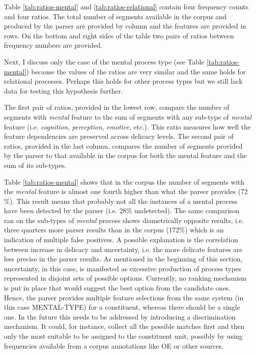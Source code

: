     Table \ref{tab:ratios-mental} and \ref{tab:ratios-relational} contain four frequency counts and four ratios. The total number of segments available in the corpus and produced by the parser are provided by column and the features are provided in rows. On the bottom and right sides of the table two pairs of ratios between frequency numbers are provided. 
    
    Next, I discuss only the case of the mental process type (see Table \ref{tab:ratios-mental}) because the values of the ratios are very similar and the same holds for relational processes. Perhaps this holds for other process types but we still lack data for testing this hypothesis further. 
    
    The first pair of ratios, provided in the lowest row, compare the number of segments with \textit{mental} feature to the sum of segments with any sub-type of \textit{mental} feature (i.e.  \textit{cognition}, \textit{perception}, \textit{emotive}, etc.). This ratio measures how well the feature dependencies are preserved across delicacy levels. The second pair of ratios, provided in the last column, compares the number of segments provided by the parser to that available in the corpus for both the mental feature and the sum of its sub-types.
    
    Table \ref{tab:ratios-mental} shows that in the corpus the number of segments with the \textit{mental} feature is almost one fourth higher than what the parser provides (72 \%). This result means that probably not all the instances of a mental process have been detected by the parser (i.e. 28\% undetected). The same comparison ran on the sub-types of \textit{mental} process shows diametrically opposite results, i.e. three quarters more parser results than in the corpus (172\%) which is an indication of multiple false positives. A possible explanation is the correlation between increase in delicacy and uncertainty, i.e. the more delicate features are less precise in the parser results. As mentioned in the beginning of this section, uncertainty, in this case, is manifested as excessive production of process types represented in disjoint sets of possible options. Currently, no ranking mechanism is put in place that would suggest the best option from the candidate ones. Hence, the parser provides multiple feature selections from the same system (in this case MENTAL-TYPE) for a constituent, whereas there should be a single one. In the future this needs to be addressed by introducing a discrimination mechanism. It could, for instance, collect all the possible matches first and then only the most suitable to be assigned to the constituent unit, possibly by using frequencies available from a corpus annotations like OE or other sources.
    
